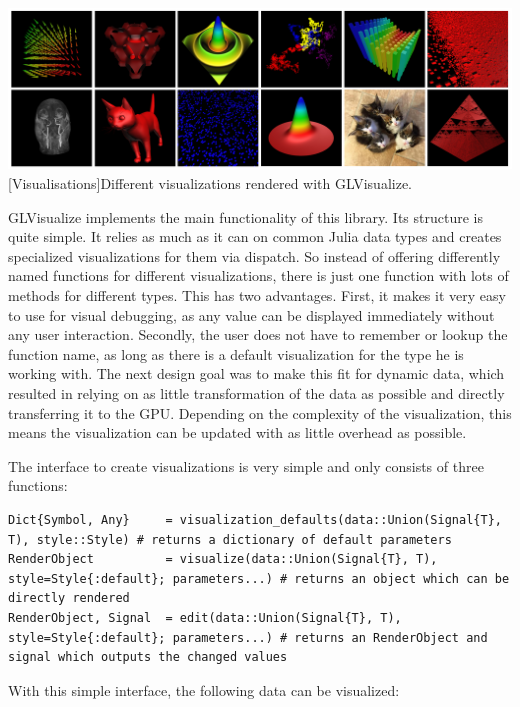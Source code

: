 \vspace{1em}
\begin{minipage}{\linewidth}
    \centering
    \includegraphics[width=0.9\linewidth]{graphics/glvisualize.jpg}
    [Visualisations]{Different visualizations rendered with GLVisualize.}
    \label{fig:glvisualize}
\end{minipage}

GLVisualize implements the main functionality of this library.
Its structure is quite simple. 
It relies as much as it can on common Julia data types and creates specialized visualizations for them via dispatch.
So instead of offering differently named functions for different visualizations, there is just one function with lots of methods for different types.
This has two advantages.
First, it makes it very easy to use for visual debugging, as any value can be displayed immediately without any user interaction.
Secondly, the user does not have to remember or lookup the function name, as long as there is a default visualization for the type he is working with.
The next design goal was to make this fit for dynamic data, which resulted in relying on as little transformation of the data as possible and directly transferring it to the GPU.
Depending on the complexity of the visualization, this means the visualization can be updated with as little overhead as possible.

The interface to create visualizations is very simple and only consists of three functions:
\begin{lstlisting}
Dict{Symbol, Any}     = visualization_defaults(data::Union(Signal{T}, T), style::Style) # returns a dictionary of default parameters
RenderObject          = visualize(data::Union(Signal{T}, T), style=Style{:default}; parameters...) # returns an object which can be directly rendered
RenderObject, Signal  = edit(data::Union(Signal{T}, T), style=Style{:default}; parameters...) # returns an RenderObject and signal which outputs the changed values

\end{lstlisting}

With this simple interface, the following data can be visualized:

